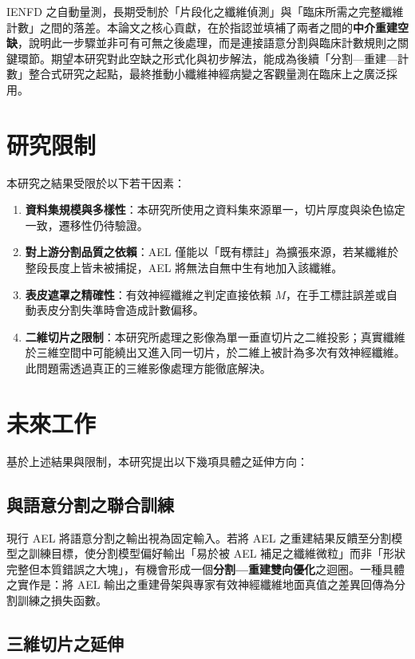 IENFD 之自動量測，長期受制於「片段化之纖維偵測」與「臨床所需之完整纖維計數」之間的落差。本論文之核心貢獻，在於指認並填補了兩者之間的\textbf{中介重建空缺}，說明此一步驟並非可有可無之後處理，而是連接語意分割與臨床計數規則之關鍵環節。期望本研究對此空缺之形式化與初步解法，能成為後續「分割—重建—計數」整合式研究之起點，最終推動小纖維神經病變之客觀量測在臨床上之廣泛採用。

\section{研究限制}
\label{sec:limitations}

本研究之結果受限於以下若干因素：

\begin{enumerate}
  \item \textbf{資料集規模與多樣性}：本研究所使用之資料集來源單一，切片厚度與染色協定一致，遷移性仍待驗證。
  \item \textbf{對上游分割品質之依賴}：AEL 僅能以「既有標註」為擴張來源，若某纖維於整段長度上皆未被捕捉，AEL 將無法自無中生有地加入該纖維。
  \item \textbf{表皮遮罩之精確性}：有效神經纖維之判定直接依賴 $M$，在手工標註誤差或自動表皮分割失準時會造成計數偏移。
  \item \textbf{二維切片之限制}：本研究所處理之影像為單一垂直切片之二維投影；真實纖維於三維空間中可能繞出又進入同一切片，於二維上被計為多次有效神經纖維。此問題需透過真正的三維影像處理方能徹底解決。
\end{enumerate}

\section{未來工作}
\label{sec:future}

基於上述結果與限制，本研究提出以下幾項具體之延伸方向：

\subsection{與語意分割之聯合訓練}

現行 AEL 將語意分割之輸出視為固定輸入。若將 AEL 之重建結果反饋至分割模型之訓練目標，使分割模型偏好輸出「易於被 AEL 補足之纖維微粒」而非「形狀完整但本質錯誤之大塊」，有機會形成一個\textbf{分割—重建雙向優化}之迴圈。一種具體之實作是：將 AEL 輸出之重建骨架與專家有效神經纖維地面真值之差異回傳為分割訓練之損失函數。

\subsection{三維切片之延伸}

